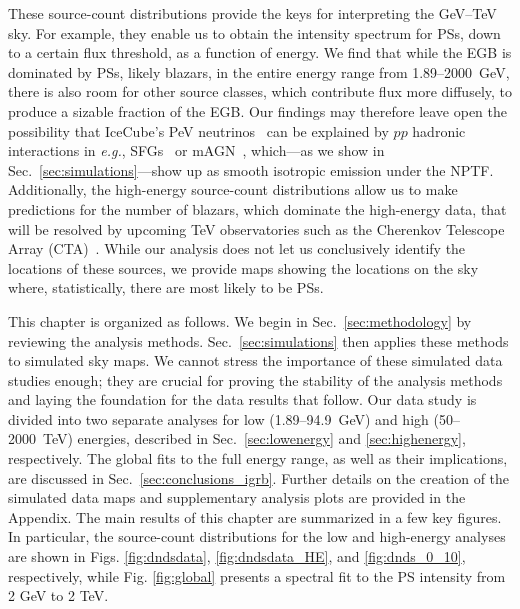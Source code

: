 These source-count distributions provide the keys for interpreting the GeV--TeV sky.  For example, they enable us to obtain the intensity spectrum for PSs, down to a certain flux threshold, as a function of energy.  We find that while the EGB is dominated by PSs, likely blazars, in the entire energy range from 1.89--2000~GeV, there is also room for other source classes, which contribute flux more diffusely, to produce a sizable fraction of the EGB.    
Our findings may therefore leave open the possibility that IceCube's PeV neutrinos~\cite{Aartsen:2013bka,Aartsen:2013jdh,Aartsen:2015knd,Aartsen:2015rwa} can be explained by $pp$ hadronic interactions in \emph{e.g.}, SFGs~\cite{Murase:2013rfa,Tamborra:2014xia,Ando:2015bva} or mAGN~\cite{Hooper:2016jls}, which---as we show in Sec.~\ref{sec:simulations}---show up as smooth isotropic emission under the NPTF.  Additionally, the high-energy source-count distributions allow us to make predictions for the number of blazars, which dominate the high-energy data, that will be resolved by upcoming TeV observatories such as the Cherenkov Telescope Array (CTA)~\cite{2011arXiv1111.2183C, Dubus:2012hm}.  
While our analysis does not let us conclusively identify the locations of these sources, we provide maps showing the locations on the sky where, statistically, there are most likely to be PSs.

This chapter is organized as follows.  We begin in Sec.~\ref{sec:methodology} by reviewing the analysis methods.  Sec.~\ref{sec:simulations} then applies these methods to simulated sky maps.  We cannot stress the importance of these simulated data studies enough; they are crucial for proving the stability of the analysis methods and laying the foundation for the data results that follow.  Our data study is divided into two separate analyses for low (1.89--94.9~GeV) and high (50--2000~TeV) energies, described in Sec.~\ref{sec:lowenergy} and \ref{sec:highenergy}, respectively. The global fits to the full energy range, as well as their implications, are discussed in Sec.~\ref{sec:conclusions_igrb}.  Further details on the creation of the simulated data maps and supplementary analysis plots are provided in the Appendix.  The main results of this chapter are summarized in a few key figures.  In particular, the source-count distributions for the low and high-energy analyses are shown in Figs. \ref{fig:dndsdata}, \ref{fig:dndsdata_HE}, and \ref{fig:dnds_0_10}, respectively, while Fig. \ref{fig:global} presents a spectral fit to the PS intensity from 2 GeV to 2 TeV.

